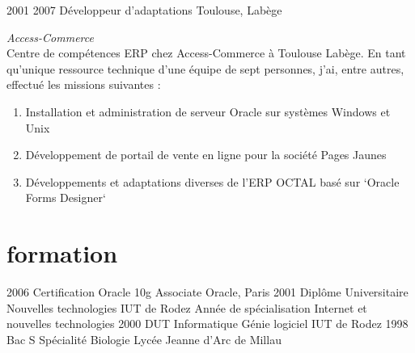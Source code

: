 \documentclass{friggeri-cv} 	%
\begin{document}
\begin{entrylist}
\entry
{2001  2007}
{Développeur d'adaptations}
{Toulouse, Labège}
{\vspace{0.2cm}\emph{Access-Commerce}  \\
Centre de compétences ERP chez Access-Commerce à Toulouse Labège.
En tant qu’unique ressource technique d'une équipe de sept personnes, j’ai, entre autres, effectué les
missions suivantes :
\begin{enumerate}
\item Installation et administration de serveur Oracle sur systèmes Windows et Unix
\item Développement de portail de vente en ligne pour la société Pages Jaunes
\item Développements et adaptations diverses de l’ERP OCTAL basé sur `Oracle Forms Designer`
\end{enumerate}
}
\end{entrylist}


\section{formation}

\begin{entrylist}
\entry
{2006}
{Certification Oracle {\normalfont 10g Associate}}
{Oracle, Paris}
{}
\entry
{2001}
{Diplôme Universitaire {\normalfont Nouvelles technologies}}
{IUT de Rodez}
{Année de spécialisation Internet et nouvelles technologies}
\entry
{2000}
{DUT {\normalfont Informatique Génie logiciel}}
{IUT de Rodez}
{}
\entry
{1998}
{Bac S {\normalfont Spécialité Biologie}}
{Lycée Jeanne d’Arc de Millau}
{}
\end{entrylist}

\end{document}
